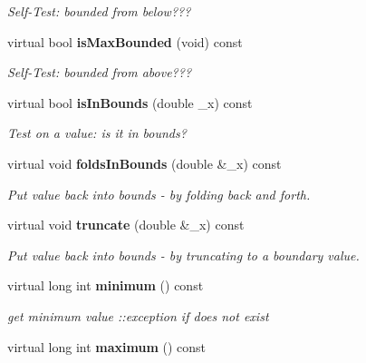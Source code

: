 \begin{CompactItemize}
\begin{CompactList}\small\item\em Self-Test: bounded from below??? \item\end{CompactList}\item 
virtual bool {\bf is\-Max\-Bounded} (void) const \label{classeo_general_int_bounds_a7}

\begin{CompactList}\small\item\em Self-Test: bounded from above??? \item\end{CompactList}\item 
virtual bool {\bf is\-In\-Bounds} (double \_\-x) const \label{classeo_general_int_bounds_a8}

\begin{CompactList}\small\item\em Test on a value: is it in bounds? \item\end{CompactList}\item 
virtual void {\bf folds\-In\-Bounds} (double \&\_\-x) const \label{classeo_general_int_bounds_a9}

\begin{CompactList}\small\item\em Put value back into bounds - by folding back and forth. \item\end{CompactList}\item 
virtual void {\bf truncate} (double \&\_\-x) const \label{classeo_general_int_bounds_a10}

\begin{CompactList}\small\item\em Put value back into bounds - by truncating to a boundary value. \item\end{CompactList}\item 
virtual long int {\bf minimum} () const \label{classeo_general_int_bounds_a11}

\begin{CompactList}\small\item\em get minimum value ::exception if does not exist \item\end{CompactList}\item 
virtual long int {\bf maximum} () const \label{classeo_general_int_bounds_a12}


\end{CompactItemize}
